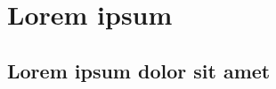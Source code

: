 \documentclass{subfiles}
\begin{document}
  \chapter{Lorem ipsum}
  \label{chap:x}

    \section{Lorem ipsum dolor sit amet}
    \label{sec:x.1}

      \paragraph{}
      \lipsum[1]
      
      \paragraph{}
      \lipsum[2]
      
      \paragraph{}
      \lipsum[3]
      
      \paragraph{}
      \lipsum[4]
      
      \paragraph{}
      \lipsum[5]
      
      \paragraph{}
      \lipsum[6]
      
      \paragraph{}
      \lipsum[7]
\end{document}
